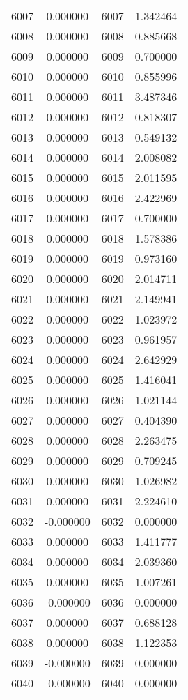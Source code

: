 \documentclass[12pt]{article}
\begin{document}
\begin{longtable}{@{}cccc@{}}
6007 & 0.000000 & 6007 & 1.342464 \\
6008 & 0.000000 & 6008 & 0.885668 \\
6009 & 0.000000 & 6009 & 0.700000 \\
6010 & 0.000000 & 6010 & 0.855996 \\
6011 & 0.000000 & 6011 & 3.487346 \\
6012 & 0.000000 & 6012 & 0.818307 \\
6013 & 0.000000 & 6013 & 0.549132 \\
6014 & 0.000000 & 6014 & 2.008082 \\
6015 & 0.000000 & 6015 & 2.011595 \\
6016 & 0.000000 & 6016 & 2.422969 \\
6017 & 0.000000 & 6017 & 0.700000 \\
6018 & 0.000000 & 6018 & 1.578386 \\
6019 & 0.000000 & 6019 & 0.973160 \\
6020 & 0.000000 & 6020 & 2.014711 \\
6021 & 0.000000 & 6021 & 2.149941 \\
6022 & 0.000000 & 6022 & 1.023972 \\
6023 & 0.000000 & 6023 & 0.961957 \\
6024 & 0.000000 & 6024 & 2.642929 \\
6025 & 0.000000 & 6025 & 1.416041 \\
6026 & 0.000000 & 6026 & 1.021144 \\
6027 & 0.000000 & 6027 & 0.404390 \\
6028 & 0.000000 & 6028 & 2.263475 \\
6029 & 0.000000 & 6029 & 0.709245 \\
6030 & 0.000000 & 6030 & 1.026982 \\
6031 & 0.000000 & 6031 & 2.224610 \\
6032 & -0.000000 & 6032 & 0.000000 \\
6033 & 0.000000 & 6033 & 1.411777 \\
6034 & 0.000000 & 6034 & 2.039360 \\
6035 & 0.000000 & 6035 & 1.007261 \\
6036 & -0.000000 & 6036 & 0.000000 \\
6037 & 0.000000 & 6037 & 0.688128 \\
6038 & 0.000000 & 6038 & 1.122353 \\
6039 & -0.000000 & 6039 & 0.000000 \\
6040 & -0.000000 & 6040 & 0.000000 \\

\end{longtable}
\end{document}
